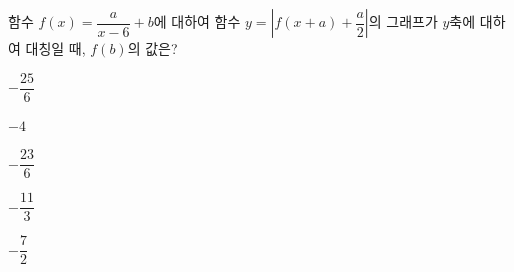 함수 $f(x)=\dfrac{a}{x-6}+b$에 대하여 함수 $y=\left|f(x+a)+\dfrac{a}{2}\right|$의 그래프가 $y$축에 대하여 대칭일 때, $f(b)$의 값은? 
\begin{choices32}{\rule[-3ex]{0pt}{8ex}$-\dfrac{25}{6}$}{\rule[-3ex]{0pt}{8ex}$-4$}{\rule[-3ex]{0pt}{8ex}$-\dfrac{23}{6}$}{\rule[-3ex]{0pt}{8ex}$-\dfrac{11}{3}$}{\rule[-3ex]{0pt}{8ex}$-\dfrac{7}{2}$}\end{choices32}
